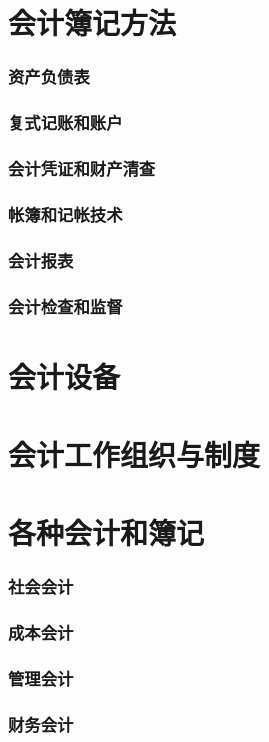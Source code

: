 \documentclass[UTF8]{../../RepresentationUniverse}
\begin{document}
\section{会计簿记方法}
    \subsubsection{资产负债表}
    \subsubsection{复式记账和账户}
    \subsubsection{会计凭证和财产清查}
    \subsubsection{帐簿和记帐技术}
    \subsubsection{会计报表}
    \subsubsection{会计检查和监督}
\section{会计设备}
\section{会计工作组织与制度}
\section{各种会计和簿记}
    \subsubsection{社会会计}
    \subsubsection{成本会计}
    \subsubsection{管理会计}
    \subsubsection{财务会计}
\end{document}
